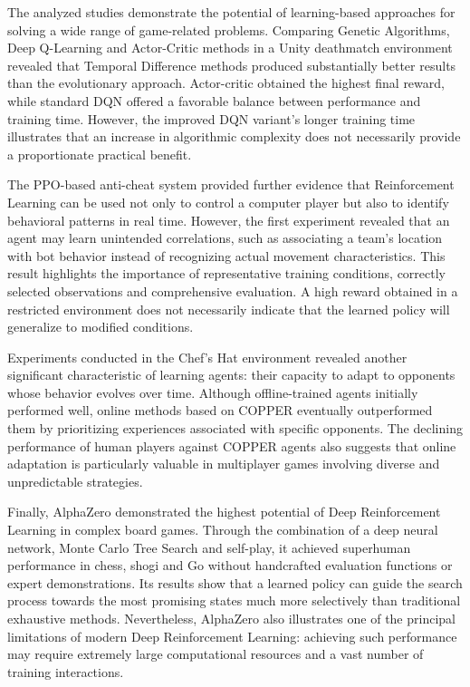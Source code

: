 The analyzed studies demonstrate the potential of learning-based approaches for solving a wide range of game-related problems. Comparing Genetic Algorithms, Deep Q-Learning and Actor-Critic methods in a Unity deathmatch environment revealed that Temporal Difference methods produced substantially better results than the evolutionary approach. Actor-critic obtained the highest final reward, while standard DQN offered a favorable balance between performance and training time. However, the improved DQN variant's longer training time illustrates that an increase in algorithmic complexity does not necessarily provide a proportionate practical benefit.

The PPO-based anti-cheat system provided further evidence that Reinforcement Learning can be used not only to control a computer player but also to identify behavioral patterns in real time. However, the first experiment revealed that an agent may learn unintended correlations, such as associating a team’s location with bot behavior instead of recognizing actual movement characteristics. This result highlights the importance of representative training conditions, correctly selected observations and comprehensive evaluation. A high reward obtained in a restricted environment does not necessarily indicate that the learned policy will generalize to modified conditions.

Experiments conducted in the Chef's Hat environment revealed another significant characteristic of learning agents: their capacity to adapt to opponents whose behavior evolves over time. Although offline-trained agents initially performed well, online methods based on COPPER eventually outperformed them by prioritizing experiences associated with specific opponents. The declining performance of human players against COPPER agents also suggests that online adaptation is particularly valuable in multiplayer games involving diverse and unpredictable strategies.

Finally, AlphaZero demonstrated the highest potential of Deep Reinforcement Learning in complex board games. Through the combination of a deep neural network, Monte Carlo Tree Search and self-play, it achieved superhuman performance in chess, shogi and Go without handcrafted evaluation functions or expert demonstrations. Its results show that a learned policy can guide the search process towards the most promising states much more selectively than traditional exhaustive methods. Nevertheless, AlphaZero also illustrates one of the principal limitations of modern Deep Reinforcement Learning: achieving such performance may require extremely large computational resources and a vast number of training interactions.

